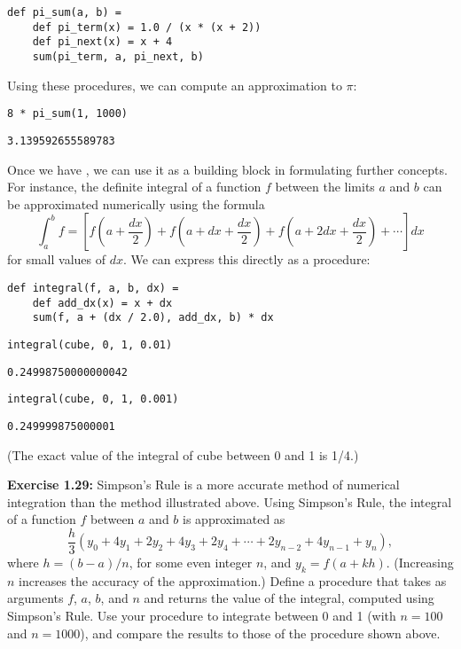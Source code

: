 \begin{lstlisting}[style=slate]
def pi_sum(a, b) =
    def pi_term(x) = 1.0 / (x * (x + 2))
    def pi_next(x) = x + 4
    sum(pi_term, a, pi_next, b)
\end{lstlisting}

Using these procedures, we can compute an approximation to $\pi$:

\begin{lstlisting}[style=slate]
8 * pi_sum(1, 1000)
\end{lstlisting}
\begin{verbatim}
3.139592655589783
\end{verbatim}

Once we have , we can use it as a building block in formulating further concepts. For instance, the definite integral of a function $f$ between the limits $a$ and $b$ can be approximated numerically using the formula
\[
\int_a^b f = \left[ f\left(a + \frac{dx}{2}\right) + f\left(a + dx + \frac{dx}{2}\right) + f\left(a + 2dx + \frac{dx}{2}\right) + \cdots \right] dx
\]
for small values of $dx$. We can express this directly as a procedure:

\begin{lstlisting}[style=slate]
def integral(f, a, b, dx) =
    def add_dx(x) = x + dx
    sum(f, a + (dx / 2.0), add_dx, b) * dx
\end{lstlisting}

\begin{lstlisting}[style=slate]
integral(cube, 0, 1, 0.01)
\end{lstlisting}
\begin{verbatim}
0.24998750000000042
\end{verbatim}

\begin{lstlisting}[style=slate]
integral(cube, 0, 1, 0.001)
\end{lstlisting}
\begin{verbatim}
0.249999875000001
\end{verbatim}

(The exact value of the integral of cube between 0 and 1 is 1/4.)

\textbf{Exercise 1.29:} Simpson's Rule is a more accurate method of numerical integration than the method illustrated above. Using Simpson's Rule, the integral of a function $f$ between $a$ and $b$ is approximated as
\[
\frac{h}{3}(y_0 + 4y_1 + 2y_2 + 4y_3 + 2y_4 + \cdots + 2y_{n-2} + 4y_{n-1} + y_n),
\]
where $h = (b-a)/n$, for some even integer $n$, and $y_k = f(a + kh)$. (Increasing $n$ increases the accuracy of the approximation.) Define a procedure that takes as arguments $f$, $a$, $b$, and $n$ and returns the value of the integral, computed using Simpson's Rule. Use your procedure to integrate  between 0 and 1 (with $n = 100$ and $n = 1000$), and compare the results to those of the  procedure shown above.

